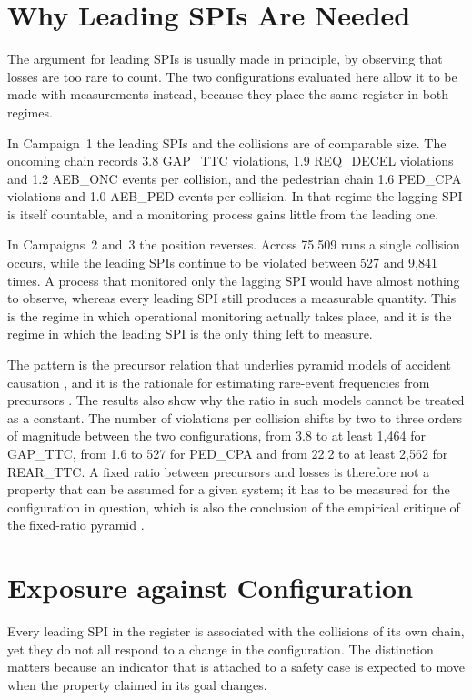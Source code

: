 \section{Why Leading SPIs Are Needed}
\label{sec:disc_leading}

The argument for leading SPIs is usually made in principle, by observing
that losses are too rare to count. The two configurations evaluated here allow it
to be made with measurements instead, because they place the same register in
both regimes.

In Campaign~1 the leading SPIs and the collisions are of comparable size. The
oncoming chain records 3.8 GAP\_TTC violations, 1.9 REQ\_DECEL violations and 1.2
AEB\_ONC events per collision, and the pedestrian chain 1.6 PED\_CPA violations
and 1.0 AEB\_PED events per collision. In that regime the lagging SPI is
itself countable, and a monitoring process gains little from the leading one.

In Campaigns~2 and~3 the position reverses. Across 75,509 runs a single collision
occurs, while the leading SPIs continue to be violated between 527 and 9,841
times. A process that monitored only the lagging SPI would have almost
nothing to observe, whereas every leading SPI still produces a measurable
quantity. This is the regime in which operational monitoring actually takes
place, and it is the regime in which the leading SPI is the only thing left
to measure.

The pattern is the precursor relation that underlies pyramid models of accident
causation \cite{heinrich1931}, and it is the rationale
for estimating rare-event frequencies from precursors \cite{bieryi1995}. The
results also show why the ratio in such models cannot be treated as a constant.
The number of violations per collision shifts by two to three orders of magnitude
between the two configurations, from 3.8 to at least 1,464 for GAP\_TTC, from 1.6
to 527 for PED\_CPA and from 22.2 to at least 2,562 for REAR\_TTC. A fixed ratio
between precursors and losses is therefore not a property that can be assumed for
a given system; it has to be measured for the configuration in question, which is
also the conclusion of the empirical critique of the fixed-ratio pyramid
\cite{yoriomoore2018}.

\section{Exposure against Configuration}
\label{sec:disc_exposure}

Every leading SPI in the register is associated with the collisions of its own
chain, yet they do not all respond to a change in the configuration. The
distinction matters because an indicator that is attached to a safety case is
expected to move when the property claimed in its goal changes.

